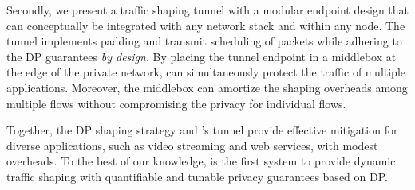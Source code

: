 Secondly, we present a traffic shaping tunnel with a modular endpoint design
that can conceptually be integrated with any network stack and within any node.
The tunnel implements padding and transmit scheduling of packets while
adhering to the DP guarantees {\em by design}.
{By placing the tunnel endpoint in a middlebox at the edge of the
private network, {\sys} can simultaneously protect
the traffic of multiple applications. Moreover, the middlebox can amortize the
shaping overheads among multiple flows without compromising the privacy for
individual flows.
}

Together, the DP shaping strategy and {\sys}'s tunnel provide effective {\nsca}
mitigation for diverse applications, such as video streaming and web services,
with modest overheads.
To the best of our knowledge, {\sys} is the first system to provide dynamic
traffic shaping with quantifiable and tunable privacy guarantees based on DP.


